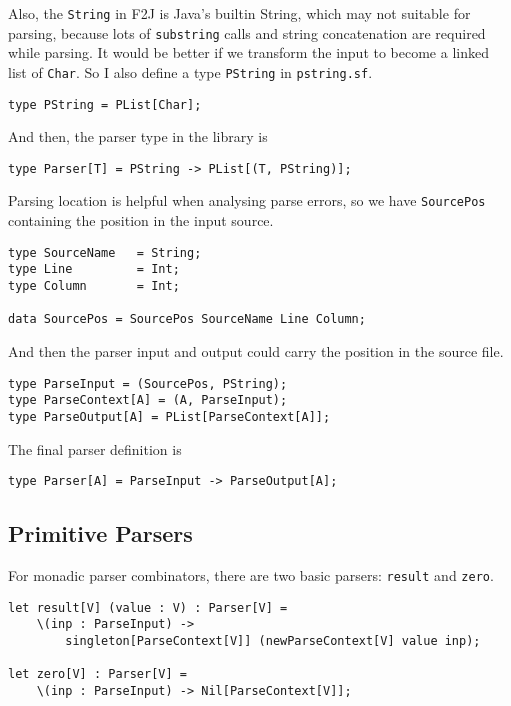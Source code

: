 Also, the \texttt{String} in F2J is Java's builtin String, which may not suitable for parsing, because lots of \texttt{substring} calls and string concatenation are required while parsing. It would be better if we transform the input to become a linked list of \texttt{Char}. So I also define a type \texttt{PString} in \texttt{pstring.sf}.

\begin{lstlisting}
type PString = PList[Char];
\end{lstlisting}

And then, the parser type in the library is

\begin{lstlisting}
type Parser[T] = PString -> PList[(T, PString)];
\end{lstlisting}

Parsing location is helpful when analysing parse errors, so we have \texttt{SourcePos} containing the position in the input source.

\begin{lstlisting}
type SourceName   = String;
type Line         = Int;
type Column       = Int;

data SourcePos = SourcePos SourceName Line Column;
\end{lstlisting}

And then the parser input and output could carry the position in the source file.

\begin{lstlisting}
type ParseInput = (SourcePos, PString);
type ParseContext[A] = (A, ParseInput);
type ParseOutput[A] = PList[ParseContext[A]];
\end{lstlisting}

The final parser definition is

\begin{lstlisting}
type Parser[A] = ParseInput -> ParseOutput[A];
\end{lstlisting}

\subsection{Primitive Parsers}

For monadic parser combinators, there are two basic parsers: \texttt{result} and \texttt{zero}.

\begin{lstlisting}
let result[V] (value : V) : Parser[V] =
    \(inp : ParseInput) ->
        singleton[ParseContext[V]] (newParseContext[V] value inp);

let zero[V] : Parser[V] =
    \(inp : ParseInput) -> Nil[ParseContext[V]];
\end{lstlisting}


